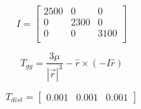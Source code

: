 \documentclass[a4paper]{article}
\begin{document}
\begin{equation}
	I = \left[\begin{matrix}
		2500 & 0    & 0 \\
		0    & 2300 & 0 \\
		0    & 0    & 3100 \\
	\end{matrix}\right]
	\label{eqn:inertia}
\end{equation}

\begin{equation}
	T_{gg} = \frac{3\mu}{|\vec{r}|^3} -\hat{r} \times (-I\hat{r})
\end{equation}

\begin{equation}
	T_{dist} = \left[\begin{matrix}
		0.001 & 0.001 & 0.001
	\end{matrix}\right]
\end{equation}
\end{document}
